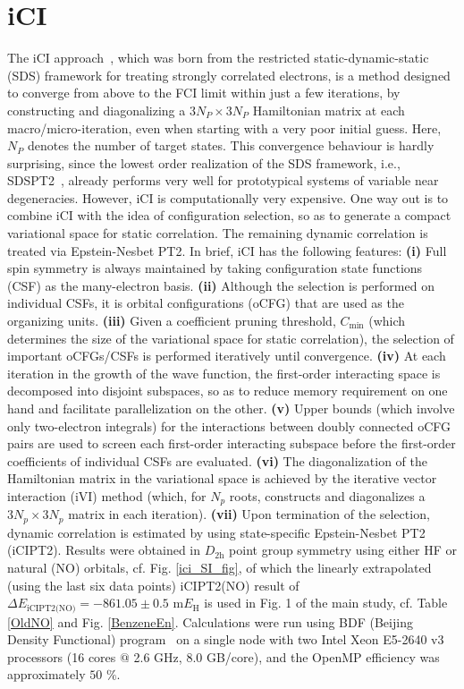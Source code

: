 \documentclass[journal=jcp,manuscript=suppinfo]{achemso}
\begin{document}
\section{iCI}

The iCI approach~\cite{liu_hoffmann_ici_jctc_2016,liu_hoffmann_ici_jctc_2020}, which was born from the restricted static-dynamic-static~\cite{liu_hoffmann_sds_tca_2014} (SDS) framework for treating strongly correlated electrons, is a method designed to converge from above to the FCI limit within just a few iterations, by constructing and diagonalizing a $3N_P\times3N_P$ Hamiltonian matrix at each macro/micro-iteration, even when starting with a very poor initial guess. Here, $N_P$ denotes the number of target states. This convergence behaviour is hardly surprising, since the lowest order realization of the SDS framework, i.e., SDSPT2~\cite{liu_hoffmann_sdspt2_mp_2017}, already performs very well for prototypical systems of variable near degeneracies. However, iCI is computationally very expensive. One way out is to combine iCI with the idea of configuration selection, so as to generate a compact variational space for static correlation. The remaining dynamic correlation is treated via Epstein-Nesbet PT2. In brief, iCI has the following features: {\bf{(i)}} Full spin symmetry is always maintained by taking configuration state functions (CSF) as the many-electron basis. {\bf{(ii)}} Although the selection is performed on individual CSFs, it is orbital configurations (oCFG) that are used as the organizing units. {\bf{(iii)}} Given a coefficient pruning threshold, $C_{\text{min}}$ (which determines the size of the variational space for static correlation), the selection of important oCFGs/CSFs is performed iteratively until convergence. {\bf{(iv)}} At each iteration in the growth of the wave function, the first-order interacting space is decomposed into disjoint subspaces, so as to reduce memory requirement on one hand and facilitate parallelization on the other. {\bf{(v)}} Upper bounds (which involve only two-electron integrals) for the interactions between doubly connected oCFG pairs are used to screen each first-order interacting subspace before the first-order coefficients of individual CSFs are evaluated. {\bf{(vi)}} The diagonalization of the Hamiltonian matrix in the variational space is achieved by the iterative vector interaction (iVI) method\cite{iVIa,iVIb} (which, for $N_p$ roots, constructs and diagonalizes a $3N_p\times 3N_p$ matrix in each iteration). {\bf{(vii)}} Upon termination of the selection, dynamic correlation is estimated by using state-specific Epstein-Nesbet PT2 (iCIPT2). Results were obtained in $D_{2\text{h}}$ point group symmetry using either HF or natural (NO) orbitals, cf. Fig. \ref{ici_SI_fig}, of which the linearly extrapolated (using the last six data points) iCIPT2(NO) result of $\Delta E_{\text{iCIPT2(NO)}} = -861.05\pm0.5$ m$E_{\text{H}}$ is used in Fig. 1 of the main study, cf. Table \ref{OldNO} and Fig. \ref{BenzeneEn}. Calculations were run using BDF (Beijing Density Functional) program~\cite{bdf_prog_tca_1997,bdf_prog_jcp_2020} on a single node with two Intel Xeon E5-2640 v3 processors (16 cores $@$ 2.6 GHz, 8.0 GB/core), and the OpenMP efficiency was approximately $50$ $\%$.\\
\end{document}
